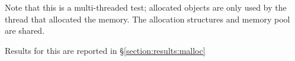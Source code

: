 Note that this is a multi-threaded test; allocated objects are only used by the thread that allocated the memory.  The allocation structures
and memory pool are shared.

Results for this are reported in \S \ref{section:results:malloc}

\endinput

\begin{comment}

    while I looked for a systematic analysis of such failures in \acs{NVM}, I did not find one in the literature (which does not
    mean there is not one, just that I could not identify it.)
    
    Thus, I decided to ``step back'' from the immediate concern and attempt to construct a model for failure
    in helping me reason about what it means.
    
    In \cite{guerraoui2008obstruction} the authors describe:
    
    \begin{quotation}
        Processes. We consider a classical asynchronous shared memory
        system [18, 24] of n processes (threads) p1, . . . , pn,
        of which n−1 may, at any time, fail by crashing. Once a process
        crashes, it does not take any further actions. The failures
        model the fact that processes may often be delayed arbitrarily
        (e.g., when de-scheduled, waiting for IO operations,
        or encountering a page fault), in which case they should
        not block other processes (the very idea behind obstruction freedom).
        A process that does not crash (in a given execution)
        is said to be correct.
    \end{quotation}
    
    I actually like this generic description of failure.  Not sure it applies here, but it is worth considering.
    
    
    \cite{rajwar2005virtualizing}
    
    \begin{quotation}
        Locks also cause vulnerability
    to thread failures and delays: if a thread holding a
    lock is delayed by a page fault, or context switch, other
    running threads may be blocked. A thread failure also
    leaves shared objects with inconsistent updates. Locks
    also inhibit concurrency because they must be used conservatively:
    a thread must acquire a lock whenever there is
    a possibility of synchronization conflict, even if such conflict
    is actually rare.
    \end{quotation}
    

\end{comment}
